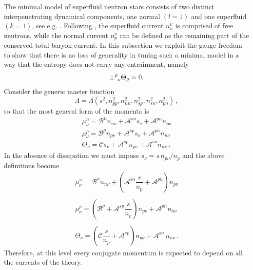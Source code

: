 \documentclass[usenatbib]{mnras}
\begin{document}
The minimal model of superfluid neutron stars consists of two distinct interpenetrating dynamical components, one normal $(l=1)$ and one superfluid $(k=1)$, see e.g. \cite{chamel_review_crust}. Following \cite{langlois98}, the superfluid current $n_n^\nu$ is comprised of free neutrons, while the normal current  $n_p^\nu$  can be defined as the remaining part of the conserved total baryon current. In this subsection we exploit the gauge freedom to show that there is no loss of generality in tuning such a minimal model in a way that the entropy does not carry any entrainment, namely
%
\begin{equation}\label{carterizzoilthermal}
{\perp}\indices{^\rho _\nu} \Theta_\rho =0.
\end{equation}
%
Consider the generic master function 
\begin{equation}
\Lambda = \Lambda (s^2,n_{pp}^2,n_{nn}^2,n_{sp}^2,n_{sn}^2,n_{pn}^2) \, ,
\end{equation}
%
so that the most general form of the momenta is
%
\begin{equation} 
\label{mometumungauged}
\begin{array}{l}
\mu^n_{\nu} = \mathcal{B}^n n_{n\nu} + \mathcal{A}^{sn} s_\nu  + \mathcal{A}^{pn} n_{p\nu}
\\
\mu^p_{\nu} = \mathcal{B}^p n_{p\nu} + \mathcal{A}^{sp} s_\nu  + \mathcal{A}^{pn} n_{n\nu}
\\
\Theta_{\nu} = \mathcal{C} s_{\nu} + \mathcal{A}^{sp} n_{p\nu}  + \mathcal{A}^{sn} n_{n\nu}  \, .
\end{array}
\end{equation}
%
In the absence of dissipation we must impose $s_\nu = s  \, n_{p\nu}/n_p$ and the above definitions become
%
\begin{equation} 
\label{mometumungauged2.0}
\begin{array}{l}
\mu^n_{\nu} = \mathcal{B}^n n_{n\nu} +\left( \mathcal{A}^{sn} \dfrac{s}{n_p}  + \mathcal{A}^{pn} \right) n_{p\nu}\\
\\
\mu^p_{\nu} = \left( \mathcal{B}^p + \mathcal{A}^{sp} \dfrac{s}{n_p} \right) n_{p\nu}  + \mathcal{A}^{pn} n_{n\nu}\\
\\
\Theta_{\nu} = \left( \mathcal{C}\dfrac{s}{n_p} + \mathcal{A}^{sp} \right) n_{p\nu}  + \mathcal{A}^{sn} \, n_{n\nu} \, .
\end{array}
\end{equation}
%
Therefore, at this level every conjugate momentum is expected to depend on all the currents of the theory. 
\end{document}
